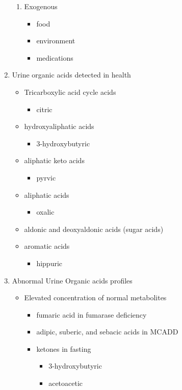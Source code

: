 \documentclass{scrartcl}
\begin{document}
\begin{enumerate}
\begin{enumerate}
\item Exogenous
\label{sec:org4206531}
\begin{itemize}
\item food
\item environment
\item medications
\end{itemize}
\end{enumerate}

\item Urine organic acids detected in health
\label{sec:org5bf9ea5}

\begin{itemize}
\item Tricarboxylic acid cycle acids
\begin{itemize}
\item citric
\end{itemize}
\item hydroxyaliphatic acids
\begin{itemize}
\item 3-hydroxybutyric
\end{itemize}
\item aliphatic keto acids
\begin{itemize}
\item pyrvic
\end{itemize}
\item aliphatic acids
\begin{itemize}
\item oxalic
\end{itemize}
\item aldonic and deoxyaldonic acids (sugar acids)
\item aromatic acids
\begin{itemize}
\item hippuric
\end{itemize}
\end{itemize}

\item Abnormal Urine Organic acids profiles
\label{sec:org33c9cb0}
\begin{itemize}
\item Elevated concentration of normal metabolites
\begin{itemize}
\item fumaric acid in fumarase deficiency
\item adipic, suberic, and sebacic acids in MCADD
\item ketones in fasting
\begin{itemize}
\item 3-hydroxybutyric
\item acetoacetic
\end{itemize}
\end{itemize}


\end{itemize}
\end{enumerate}
\end{document}
